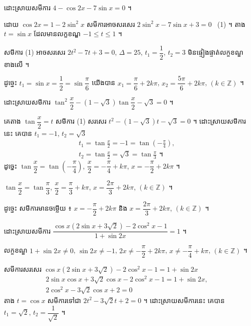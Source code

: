 \begin{example}[ឧទាហរណ៍ ១]
ដោះស្រាយសមីការ $4 - \cos 2x - 7\sin x = 0$ ។

ដោយ $\cos 2x = 1 - 2\sin^2 x$ សមីការអាចសរសេរ $2\sin^2 x - 7\sin x + 3 = 0$ \ (1) ។ តាង $t = \sin x$ ដែលមានលក្ខខណ្ឌ $-1 \le t \le 1$ ។

សមីការ (1) អាចសរសេរ $2t^2 - 7t + 3 = 0$, $\Delta = 25$, $t_1 = \dfrac{1}{2}$, $t_2 = 3$ មិនផ្ទៀងផ្ទាត់លក្ខខណ្ឌខាងលើ ។

ដូច្នេះ $t_1 = \sin x = \dfrac{1}{2} = \sin\dfrac{\pi}{6}$ យើងបាន $x_1 = \dfrac{\pi}{6} + 2k\pi$, $x_2 = \dfrac{5\pi}{6} + 2k\pi$, $(k \in \mathbb{Z})$ ។
\end{example}

\begin{example}[ឧទាហរណ៍ ២]
ដោះស្រាយសមីការ $\tan^2\dfrac{x}{2} - (1 - \sqrt{3})\tan\dfrac{x}{2} - \sqrt{3} = 0$ ។

គេតាង $\tan\dfrac{x}{2} = t$ សមីការ (1) សរសេរ $t^2 - (1 - \sqrt{3})t - \sqrt{3} = 0$ ។ ដោះស្រាយសមីការនេះ គេបាន $t_1 = -1$, $t_2 = \sqrt{3}$
\[
\begin{gathered}
t_1 = \tan\frac{x}{2} = -1 = \tan\left(-\frac{\pi}{4}\right),\\
t_2 = \tan\frac{x}{2} = \sqrt{3} = \tan\frac{\pi}{3} \text{ ។}
\end{gathered}
\]
ដូច្នេះ $\tan\dfrac{x}{2} = \tan\left(-\dfrac{\pi}{4}\right)$, $\dfrac{x}{2} = -\dfrac{\pi}{4} + k\pi$, $x = -\dfrac{\pi}{2} + 2k\pi$ ។

$\tan\dfrac{x}{2} = \tan\dfrac{\pi}{3}$, $\dfrac{x}{2} = \dfrac{\pi}{3} + k\pi$, $x = \dfrac{2\pi}{3} + 2k\pi$, $(k \in \mathbb{Z})$ ។

ដូច្នេះ សមីការមានចម្លើយ ៖ $x = -\dfrac{\pi}{2} + 2k\pi$ និង $x = \dfrac{2\pi}{3} + 2k\pi$, $(k \in \mathbb{Z})$ ។
\end{example}

\begin{example}[លំហាត់គំរូ ២]
ដោះស្រាយសមីការ $\dfrac{\cos x(2\sin x + 3\sqrt{2}) - 2\cos^2 x - 1}{1 + \sin 2x} = 1$ ។
\end{example}
\ans
លក្ខខណ្ឌ $1 + \sin 2x \ne 0$, $\sin 2x \ne -1$, $2x \ne -\dfrac{\pi}{2} + 2k\pi$, $x \ne -\dfrac{\pi}{4} + k\pi$, $(k \in \mathbb{Z})$ ។

សមីការសរសេរ $\cos x(2\sin x + 3\sqrt{2}) - 2\cos^2 x - 1 = 1 + \sin 2x$
\[
\begin{gathered}
2\sin x\cos x + 3\sqrt{2}\cos x - 2\cos^2 x - 1 = 1 + \sin 2x,\\
2\cos^2 x - 3\sqrt{2}\cos x + 2 = 0
\end{gathered}
\]
តាង $t = \cos x$ សមីការទៅជា $2t^2 - 3\sqrt{2}t + 2 = 0$ ។ ដោះស្រាយសមីការនេះ គេបាន $t_1 = \sqrt{2}$, $t_2 = \dfrac{1}{\sqrt{2}}$ ។

